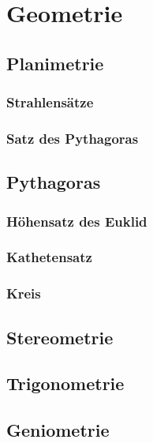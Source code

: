\section{Geometrie}
\subsection{Planimetrie}
\subsubsection{Strahlensätze}
\subsubsection{Satz des Pythagoras}

\subsection{Pythagoras}





\subsubsection{Höhensatz des Euklid}
\subsubsection{Kathetensatz}

\subsubsection{Kreis}


\begin{figure}
    \hfill
\end{figure}

\subsection{Stereometrie}
\subsection{Trigonometrie}
\subsection{Geniometrie}